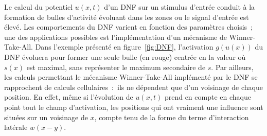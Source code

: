 \documentclass[../main]{subfiles}
\begin{document}
Le calcul du potentiel $u(x,t)$ d'un DNF sur un stimulus d'entrée conduit à la formation de bulles d'activité évoluant dans les zones ou le signal d'entrée est élevé.
Les comportements du DNF varient en fonction des paramètres choisis~; une des applications possibles est l'implémentation d'un mécanisme de Winner-Take-All. 
Dans l'exemple présenté en figure~\ref{fig:DNF}, l'activation $g(u(x))$ du DNF évoluera pour former une seule bulle (en rouge) centrée en la valeur où $s(x)$ est maximal, sans représenter le maximum secondaire de $s$.
Par ailleurs, les calculs permettant le mécanisme Winner-Take-All implémenté par le DNF se rapprochent de calculs cellulaires~:~ils ne dépendent que d'un voisinage de chaque position.
En effet, même si l'évolution de $u(x,t)$ prend en compte en chaque point tout le champ d'activation, les positions qui ont vraiment une influence sont situées sur un voisinage de $x$, compte tenu de la forme du terme d'interaction latérale $w(x-y)$.
\end{document}
